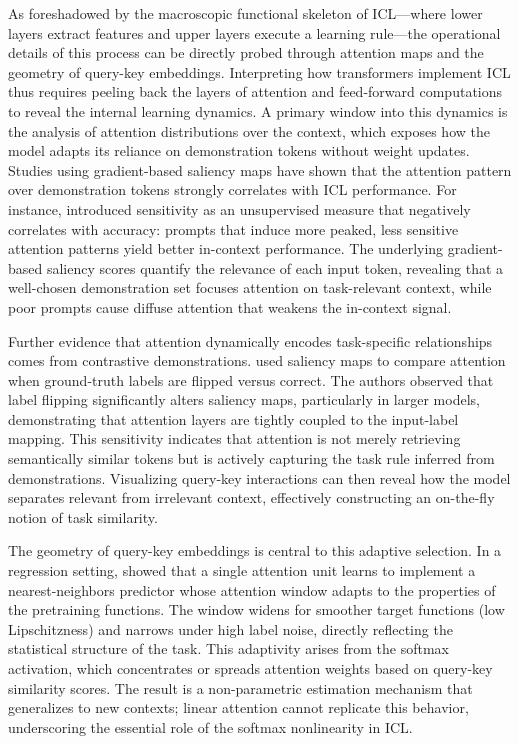 \documentclass[11pt]{article}
\begin{document}
As foreshadowed by the macroscopic functional skeleton of ICL---where lower layers extract features and upper layers execute a learning rule---the operational details of this process can be directly probed through attention maps and the geometry of query-key embeddings. Interpreting how transformers implement ICL thus requires peeling back the layers of attention and feed-forward computations to reveal the internal learning dynamics. A primary window into this dynamics is the analysis of attention distributions over the context, which exposes how the model adapts its reliance on demonstration tokens without weight updates. Studies using gradient-based saliency maps have shown that the attention pattern over demonstration tokens strongly correlates with ICL performance. For instance, \cite{ref64} introduced sensitivity as an unsupervised measure that negatively correlates with accuracy: prompts that induce more peaked, less sensitive attention patterns yield better in-context performance. The underlying gradient-based saliency scores quantify the relevance of each input token, revealing that a well-chosen demonstration set focuses attention on task-relevant context, while poor prompts cause diffuse attention that weakens the in-context signal.

Further evidence that attention dynamically encodes task-specific relationships comes from contrastive demonstrations. \cite{ref44} used saliency maps to compare attention when ground-truth labels are flipped versus correct. The authors observed that label flipping significantly alters saliency maps, particularly in larger models, demonstrating that attention layers are tightly coupled to the input-label mapping. This sensitivity indicates that attention is not merely retrieving semantically similar tokens but is actively capturing the task rule inferred from demonstrations. Visualizing query-key interactions can then reveal how the model separates relevant from irrelevant context, effectively constructing an on-the-fly notion of task similarity.

The geometry of query-key embeddings is central to this adaptive selection. In a regression setting, \cite{ref20} showed that a single attention unit learns to implement a nearest-neighbors predictor whose attention window adapts to the properties of the pretraining functions. The window widens for smoother target functions (low Lipschitzness) and narrows under high label noise, directly reflecting the statistical structure of the task. This adaptivity arises from the softmax activation, which concentrates or spreads attention weights based on query-key similarity scores. The result is a non-parametric estimation mechanism that generalizes to new contexts; linear attention cannot replicate this behavior, underscoring the essential role of the softmax nonlinearity in ICL.
\end{document}
